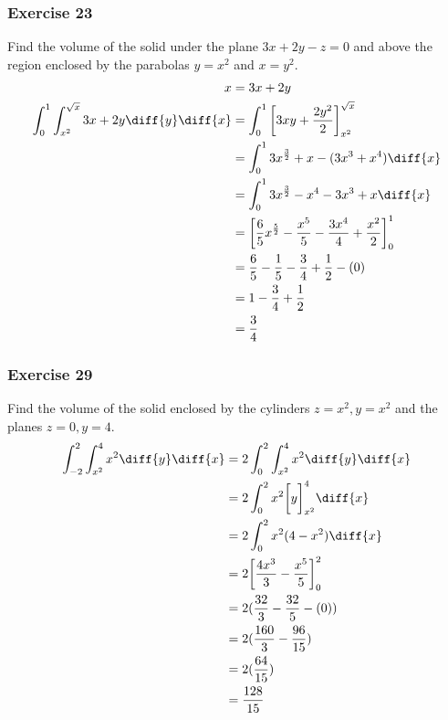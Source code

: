 \documentclass[letterpaper, 12pt]{math}
\begin{document}
\subsubsection*{Exercise 23}
Find the volume of the solid under the plane \( 3x+2y-z = 0 \) and above the
region enclosed by the parabolas \( y = x^2 \) and \( x = y^2 \).
\begin{align*}
  x &= 3x+2y \\
  \int_{0}^{1}\int_{x^2}^{\sqrt{x}}3x+2y\diff{y}\diff{x} &=
    \int_{0}^{1}\bigg[3xy+\frac{2y^2}{2}\bigg]_{x^2}^{\sqrt{x}} \\
  &= \int_{0}^{1}3x^{\frac{3}{2}}+x-(3x^3+x^4)\diff{x} \\
  &= \int_{0}^{1}3x^{\frac{3}{2}}-x^4-3x^3+x\diff{x} \\
  &= \bigg[
    \frac{6}{5}x^{\frac{5}{2}}-\frac{x^5}{5}-\frac{3x^4}{4}+\frac{x^2}{2}
    \bigg]_{0}^{1} \\
  &= \frac{6}{5}-\frac{1}{5}-\frac{3}{4}+\frac{1}{2}-(0) \\
  &= 1-\frac{3}{4}+\frac{1}{2} \\
  &= \frac{3}{4}
\end{align*}

\subsubsection*{Exercise 29}
Find the volume of the solid enclosed by the cylinders \( z = x^2, y = x^2 \)
and the planes \( z = 0, y = 4 \).
\begin{align*}
  \int_{-2}^{2}\int_{x^2}^{4}x^2\diff{y}\diff{x} &=
    2\int_{0}^{2}\int_{x^2}^{4}x^2\diff{y}\diff{x} \\
  &= 2\int_{0}^{2}x^2\bigg[y\bigg]_{x^2}^{4}\diff{x} \\
  &= 2\int_{0}^{2}x^2(4-x^2)\diff{x} \\
  &= 2\bigg[\frac{4x^3}{3}-\frac{x^5}{5}\bigg]_{0}^{2} \\
  &= 2(\frac{32}{3}-\frac{32}{5}-(0)) \\
  &= 2(\frac{160}{3}-\frac{96}{15}) \\
  &= 2(\frac{64}{15}) \\
  &= \frac{128}{15}
\end{align*}
\end{document}
